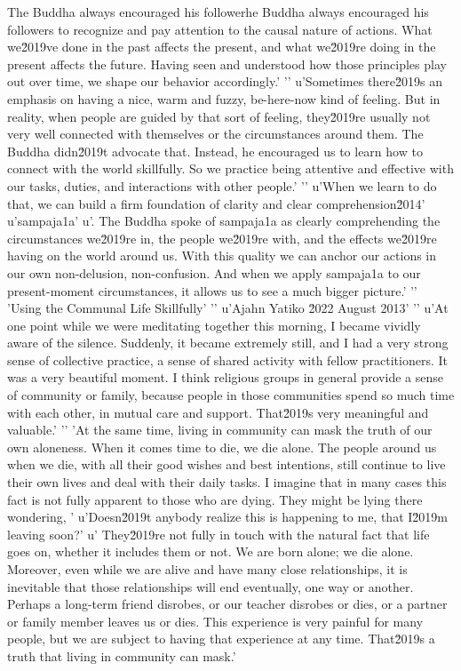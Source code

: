 The Buddha always encouraged his followerhe Buddha always encouraged his followers to recognize and pay attention to the causal nature of actions. What we\u2019ve done in the past affects the present, and what we\u2019re doing in the present affects the future. Having seen and understood how those principles play out over time, we shape our behavior accordingly.'
'\n'
u'Sometimes there\u2019s an emphasis on having a nice, warm and fuzzy, be-here-now kind of feeling. But in reality, when people are guided by that sort of feeling, they\u2019re usually not very well connected with themselves or the circumstances around them. The Buddha didn\u2019t advocate that. Instead, he encouraged us to learn how to connect with the world skillfully. So we practice being attentive and effective with our tasks, duties, and interactions with other people.'
'\n'
u'When we learn to do that, we can build a firm foundation of clarity and clear comprehension\u2014'
u'sampaja\xf1a'
u'. The Buddha spoke of sampaja\xf1a as clearly comprehending the circumstances we\u2019re in, the people we\u2019re with, and the effects we\u2019re having on the world around us. With this quality we can anchor our actions in our own non-delusion, non-confusion. And when we apply sampaja\xf1a to our present-moment circumstances, it allows us to see a much bigger picture.'
'\n'
'Using the Communal Life Skillfully'
'\n'
u'Ajahn Yatiko \u2022 August 2013'
'\n'
u'At one point while we were meditating together this morning, I became vividly aware of the silence. Suddenly, it became extremely still, and I had a very strong sense of collective practice, a sense of shared activity with fellow practitioners. It was a very beautiful moment. I think religious groups in general provide a sense of community or family, because people in those communities spend so much time with each other, in mutual care and support. That\u2019s very meaningful and valuable.'
'\n'
'At the same time, living in community can mask the truth of our own aloneness. When it comes time to die, we die alone. The people around us when we die, with all their good wishes and best intentions, still continue to live their own lives and deal with their daily tasks. I imagine that in many cases this fact is not fully apparent to those who are dying. They might be lying there wondering, '
u'Doesn\u2019t anybody realize this is happening to me, that I\u2019m leaving soon?'
u' They\u2019re not fully in touch with the natural fact that life goes on, whether it includes them or not. We are born alone; we die alone. Moreover, even while we are alive and have many close relationships, it is inevitable that those relationships will end eventually, one way or another. Perhaps a long-term friend disrobes, or our teacher disrobes or dies, or a partner or family member leaves us or dies. This experience is very painful for many people, but we are subject to having that experience at any time. That\u2019s a truth that living in community can mask.'
